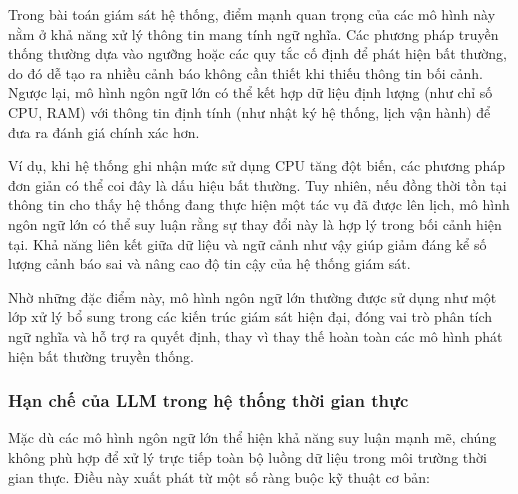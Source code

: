 Trong bài toán giám sát hệ thống, điểm mạnh quan trọng của các mô hình này nằm ở khả năng xử lý thông tin mang tính ngữ nghĩa. Các phương pháp truyền thống thường dựa vào ngưỡng hoặc các quy tắc cố định để phát hiện bất thường, do đó dễ tạo ra nhiều cảnh báo không cần thiết khi thiếu thông tin bối cảnh. Ngược lại, mô hình ngôn ngữ lớn có thể kết hợp dữ liệu định lượng (như chỉ số CPU, RAM) với thông tin định tính (như nhật ký hệ thống, lịch vận hành) để đưa ra đánh giá chính xác hơn.

Ví dụ, khi hệ thống ghi nhận mức sử dụng CPU tăng đột biến, các phương pháp đơn giản có thể coi đây là dấu hiệu bất thường. Tuy nhiên, nếu đồng thời tồn tại thông tin cho thấy hệ thống đang thực hiện một tác vụ đã được lên lịch, mô hình ngôn ngữ lớn có thể suy luận rằng sự thay đổi này là hợp lý trong bối cảnh hiện tại. Khả năng liên kết giữa dữ liệu và ngữ cảnh như vậy giúp giảm đáng kể số lượng cảnh báo sai và nâng cao độ tin cậy của hệ thống giám sát.

Nhờ những đặc điểm này, mô hình ngôn ngữ lớn thường được sử dụng như một lớp xử lý bổ sung trong các kiến trúc giám sát hiện đại, đóng vai trò phân tích ngữ nghĩa và hỗ trợ ra quyết định, thay vì thay thế hoàn toàn các mô hình phát hiện bất thường truyền thống.
\subsubsection{Hạn chế của LLM trong hệ thống thời gian thực}
Mặc dù các mô hình ngôn ngữ lớn thể hiện khả năng suy luận mạnh mẽ, chúng không phù hợp để xử lý trực tiếp toàn bộ luồng dữ liệu trong môi trường thời gian thực. Điều này xuất phát từ một số ràng buộc kỹ thuật cơ bản:

